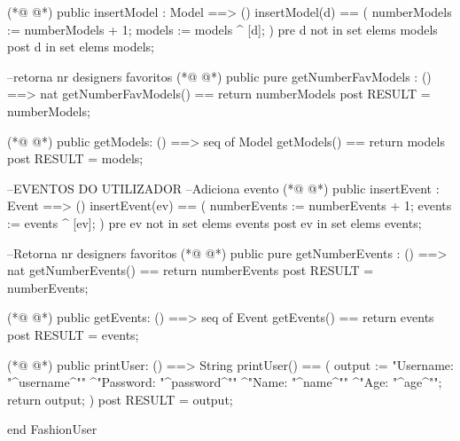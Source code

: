 \begin{vdmpp}[breaklines=true]
(*@
\label{insertModel:77}
@*)
   public insertModel : Model ==> ()
   insertModel(d) ==
   (
     numberModels := numberModels + 1;
     models := models ^ [d];
   )
   pre d not in set elems models
   post d in set elems models;
   
  --retorna nr designers favoritos
(*@
\label{getNumberFavModels:87}
@*)
   public pure getNumberFavModels : () ==> nat
   getNumberFavModels() == return numberModels
   post RESULT = numberModels;
   
(*@
\label{getModels:91}
@*)
   public getModels: () ==> seq of Model
   getModels() == return models
    post RESULT = models;
   
    --EVENTOS DO UTILIZADOR
    --Adiciona evento
(*@
\label{insertEvent:97}
@*)
  public insertEvent : Event ==> ()
   insertEvent(ev) ==
   (
     numberEvents := numberEvents + 1;
     events := events ^ [ev];
   )
   pre ev not in set elems events
   post ev in set elems events;
   
   
  --Retorna nr designers favoritos
(*@
\label{getNumberEvents:108}
@*)
   public pure getNumberEvents : () ==> nat
   getNumberEvents() == return numberEvents
  post RESULT = numberEvents;
  

(*@
\label{getEvents:113}
@*)
   public getEvents: () ==> seq of Event
   getEvents() == return events
   post RESULT = events;
   
(*@
\label{printUser:117}
@*)
   public printUser: () ==> String
  printUser() == (
  output := "Username: "^username^"\n"
       ^"Password: "^password^"\n"
       ^"Name: "^name^"\n"
       ^"Age: "^age^"\n";
  return output;
  )
   post RESULT = output;
   
end FashionUser
\end{vdmpp}
\bigskip
